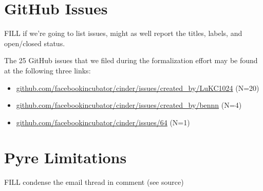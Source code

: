 \documentclass[english,cleveref,submission]{programming}
\newcommand{\shorturl}[2]{\href{#1#2}{#2}}
\begin{document}
{\sloppy
\printbibliography
}

\appendix

\section{GitHub Issues}
\label{a:github-issues}

FILL if we're going to list issues, might as well report the titles, labels, and open/closed status.

The 25 GitHub issues that we filed during the formalization effort may be found at the following three links:

\begin{itemize}
  \item \shorturl{https://}{github.com/facebookincubator/cinder/issues/created\_by/LuKC1024} (N=20)
  \item \shorturl{https://}{github.com/facebookincubator/cinder/issues/created\_by/bennn} (N=4)
  \item \shorturl{https://}{github.com/facebookincubator/cinder/issues/64} (N=1)
\end{itemize}


\section{Pyre Limitations}

FILL condense the email thread in comment (see source)
\end{document}
